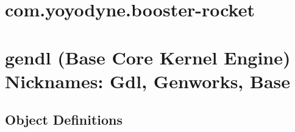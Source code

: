 \documentclass [11pt]{book}
\begin{document}
\section{com.yoyodyne.booster-rocket }

\label{sec:com.yoyodyne.booster-rocket}







\section{gendl (Base Core Kernel Engine) Nicknames: Gdl, Genworks, Base}

\label{sec:gendl(basecorekernelengine)nicknames:gdl,genworks,base}





\subsection{Object Definitions}

\label{subsec:objectdefinitions}
\end{document}

